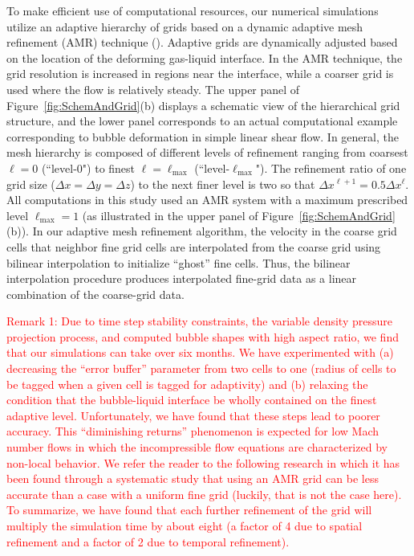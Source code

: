 \documentclass{elsarticle}
\begin{document}
To make efficient use of computational resources, our numerical simulations utilize an adaptive hierarchy of grids based on a dynamic adaptive mesh refinement (AMR) technique (\citet{SusAlmBelColHowWel99}).  Adaptive grids are dynamically adjusted based on the location of the deforming gas-liquid interface.  In the AMR technique, the grid resolution is increased in regions near the interface, while a coarser grid is used where the flow is relatively steady.  The upper panel of Figure~\ref{fig:SchemAndGrid}(b) displays a schematic view of the hierarchical grid structure, and the lower panel corresponds to an actual computational example corresponding to bubble deformation in simple linear shear flow.  In general, the mesh hierarchy is composed of different levels of refinement ranging from coarsest $\ell=0$ (``level-0") to finest $\ell=\ell_{\textrm{max}}$ (``level-$\ell_{\textrm{max}}$").  The refinement ratio of one grid size ($\Delta x=\Delta y=\Delta z$) to the next finer level is two so that $\Delta x^{\ell+1}=0.5\Delta x^{\ell}$.  All computations in this study used an AMR system with a maximum prescribed level $\ell_{\textrm{max}} = 1$ (as illustrated in the upper panel of Figure~\ref{fig:SchemAndGrid}(b)).  In our adaptive mesh refinement algorithm, the velocity in the coarse grid cells that neighbor fine grid cells are interpolated from the coarse grid using bilinear interpolation to initialize ``ghost'' fine cells. Thus, the bilinear interpolation procedure produces interpolated fine-grid data as a linear combination of the coarse-grid data.
\par
\textcolor{red}
{
Remark 1: Due to time step stability constraints, the variable density pressure projection process, and computed bubble shapes with high aspect ratio, we find that our simulations can take over six months.  We have experimented with (a) decreasing the ``error buffer'' parameter from two cells to one (radius of cells to be tagged when a given cell is tagged for adaptivity) and (b) relaxing the condition that the bubble-liquid interface be wholly contained on the finest adaptive level.  Unfortunately, we have found that these steps lead to poorer accuracy.  This ``diminishing returns'' phenomenon is expected for low Mach number flows in which the incompressible flow equations are characterized by non-local behavior.  We refer the reader to the following research\cite{li2016high} in which it has been found through a systematic study that using an AMR grid can be less accurate than a case with a uniform fine grid (luckily, that is not the case here).  To summarize, we have found that each further refinement of the grid will multiply the simulation time by about eight (a factor of 4 due to spatial refinement and a factor of 2 due to temporal refinement).
}
\end{document}
